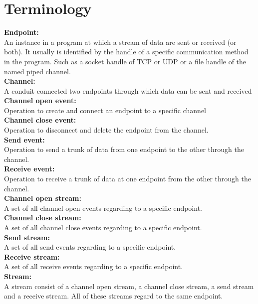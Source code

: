 \label{chapter:appendix}

\section{Terminology}\label{term}
\textbf{Endpoint:}\\
An instance in a program at which a stream of data are sent or received (or both). It usually is identified by the handle of a specific communication method in the program. Such as a socket handle of TCP or UDP or a file handle of the named piped channel.\\
\textbf{Channel:}\\
A conduit connected two endpoints through  which data can be sent and received\\
\textbf{Channel open event:}\\
Operation to create and connect an endpoint to a specific channel\\
\textbf{Channel close event:}\\
Operation to disconnect and delete the endpoint from the channel.\\
\textbf{Send event:}\\
Operation to send a trunk of data from one endpoint to the other through  the channel.\\
\textbf{Receive event:}\\
Operation to receive a trunk of data at one endpoint from the other through the channel.\\
\textbf{Channel open stream:}\\
A set of all channel open events regarding to a specific endpoint.\\
\textbf{Channel close stream:}\\
A set of all channel close events regarding to a specific endpoint.\\
\textbf{Send stream:}\\
A set of all send events regarding to a specific endpoint.\\
\textbf{Receive stream:}\\
A set of all receive events regarding to a specific endpoint.\\
\textbf{Stream:}\\
A stream consist of a channel open stream, a channel close stream, a send stream and a receive stream. All of these streams regard to the same endpoint.


